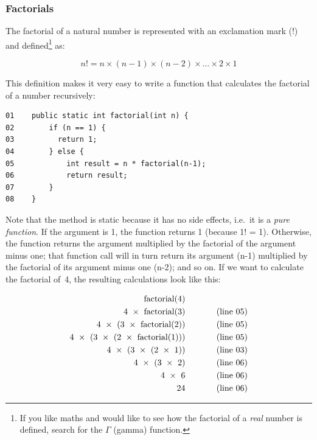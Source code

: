\subsubsection{Factorials}

The factorial of a natural number is represented with an exclamation
mark (!) and defined\footnote{If you like maths and would like to see
  how the factorial of a \emph{real} number is defined, search for the
  $\Gamma$ (gamma) function.} as:  

$$ n! = n \times (n - 1) \times (n - 2) \times \ldots \times 2 \times 1 $$

This definition makes it very easy to write a function that calculates
the factorial of a number recursively: 

\begin{verbatim}
01    public static int factorial(int n) {
02        if (n == 1) {
03          return 1; 
04        } else {
05            int result = n * factorial(n-1);
06            return result;
07        }
08    }
\end{verbatim}

Note that the method is static because it has no side effects,
i.e.~it is a \emph{pure function}. 
If the argument is 1, the function returns 1 (because 1! =
1). Otherwise, the function returns the argument multiplied by the
factorial of the argument minus one; that function call will in turn
return its argument (n-1) multiplied by the factorial of its argument
minus one (n-2); and so on. If we want to calculate the factorial
of~4, the resulting calculations look like this: 

\begin{equation*}
 \begin{aligned}
  \textrm{factorial(4)} & ~~~~~~~~~~~ \verb++\\
  \textrm{4 } \times \textrm{ factorial(3)} & ~~~~~~~~~~~ \textrm{(line 05)} \\
  \textrm{4 } \times \textrm{ (3 } \times \textrm{ factorial(2))} &  ~~~~~~~~~~~ \textrm{(line 05)} \\
  \textrm{4 } \times \textrm{ (3 } \times \textrm{ (2 } \times  \textrm{ factorial(1)))} & ~~~~~~~~~~~ \textrm{(line 05)}\\
  \textrm{4 } \times \textrm{ (3 } \times \textrm{ (2 } \times  \textrm{ 1))} & ~~~~~~~~~~~ \textrm{(line 03)}\\
  \textrm{4 } \times \textrm{ (3 } \times \textrm{ 2)} & ~~~~~~~~~~~ \textrm{(line 06)} \\
  \textrm{4 } \times \textrm{ 6} & ~~~~~~~~~~~ \textrm{(line 06)}\\
  \textrm{24} & ~~~~~~~~~~~ \textrm{(line 06)}\\
 \end{aligned}
\end{equation*}

